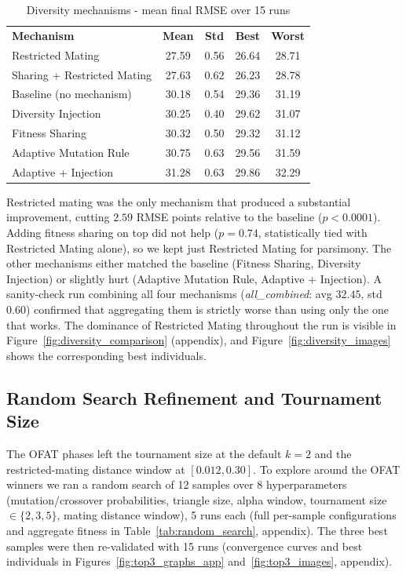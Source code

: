 \documentclass[11pt,a4paper]{article}
\newcommand{\tH}[1]{\textcolor{novagreen}{\textbf{#1}}}
\newcommand{\gmid}{\arrayrulecolor{novagreen}\midrule\arrayrulecolor{black}}
\begin{document}
\begin{table}[h]
\centering
\begin{tabular}{lcccc}
\toprule
\tH{Mechanism} & \tH{Mean} & \tH{Std} & \tH{Best} & \tH{Worst} \\
\gmid
Restricted Mating          & 27.59 & 0.56 & 26.64 & 28.71 \\
Sharing + Restricted Mating & 27.63 & 0.62 & 26.23 & 28.78 \\
Baseline (no mechanism)    & 30.18 & 0.54 & 29.36 & 31.19 \\
Diversity Injection        & 30.25 & 0.40 & 29.62 & 31.07 \\
Fitness Sharing            & 30.32 & 0.50 & 29.32 & 31.12 \\
Adaptive Mutation Rule     & 30.75 & 0.63 & 29.56 & 31.59 \\
Adaptive + Injection       & 31.28 & 0.63 & 29.86 & 32.29 \\
\bottomrule
\end{tabular}
\caption{Diversity mechanisms - mean final RMSE over 15 runs}
\end{table}

Restricted mating was the only mechanism that produced a substantial
improvement, cutting $2.59$ RMSE points relative to the baseline
($p < 0.0001$). Adding fitness sharing on top did not help ($p = 0.74$,
statistically tied with Restricted Mating alone), so we kept just
Restricted Mating for parsimony. The other mechanisms either matched
the baseline (Fitness Sharing, Diversity Injection) or slightly hurt
(Adaptive Mutation Rule, Adaptive + Injection). A sanity-check run
combining all four mechanisms (\textit{all\_combined}: avg $32.45$, std
$0.60$) confirmed that aggregating them is strictly worse than using
only the one that works. The dominance of Restricted Mating throughout
the run is visible in Figure~\ref{fig:diversity_comparison} (appendix),
and Figure~\ref{fig:diversity_images} shows the corresponding best
individuals.

\subsection{Random Search Refinement and Tournament Size}

The OFAT phases left the tournament size at the default
$k=2$ and the restricted-mating distance window at $[0.012, 0.30]$. To
explore around the OFAT winners we ran a random search of 12 samples
over 8 hyperparameters (mutation/crossover probabilities, triangle size,
alpha window, tournament size $\in \{2, 3, 5\}$, mating distance window),
5 runs each (full per-sample configurations and aggregate fitness in
Table~\ref{tab:random_search}, appendix). The three best samples were
then re-validated with 15 runs (convergence curves and best individuals
in Figures~\ref{fig:top3_graphs_app} and~\ref{fig:top3_images},
appendix).
\end{document}
